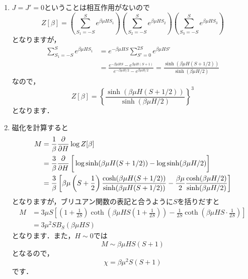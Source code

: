 \documentclass[a4paper,pdflatex,ja=standard]{bxjsarticle}
\begin{document}
\begin{enumerate}
  
  \item 

  $J=J'=0$ということは相互作用がないので
  \begin{equation}
    Z[\beta]
    =
    \left(  
      \sum_{S_1=-S}^{S}
      e^{\beta\mu HS_1}
    \right)
    \left(  
      \sum_{S_2=-S}^{S}
      e^{\beta\mu HS_2}
    \right)
    \left(  
      \sum_{S_3=-S}^{S}
      e^{\beta\mu HS_3}
    \right)
  \end{equation}
  となりますが，
  \begin{align}    
    \sum_{S_1=-S}^{S}
    e^{\beta\mu HS_1}
    &=
    e^{-\beta\mu HS}
    \sum_{S'=0}^{2S}
    e^{\beta\mu HS'}
    \nonumber
    \\
    &=
    \frac{e^{-\beta\mu HS}-e^{\beta\mu H(S+1)}}{e^{-\beta\mu H/2}-e^{\beta\mu H/2}}
    =
    \frac{\sinh(\beta\mu H(S+1/2))}{\sinh(\beta\mu H/2)}
  \end{align}
  なので，
  \begin{equation}
    Z[\beta]
    =\left\{  
      \frac{\sinh(\beta\mu H(S+1/2))}{\sinh(\beta\mu H/2)}      
    \right\}^3
  \end{equation}
  となります．


  \item 

  磁化を計算すると
  \begin{align}
    M
    &=
    \frac{1}{\beta}
    \pdv{}{H}\log Z[\beta]
    \nonumber
    \\
    &=
    \frac{3}{\beta}
    \pdv{}{H}
    \left[  
      \vphantom{\dfrac{1}{2}}
      \log\sinh(\beta\mu H(S+1/2))
      -
      \log\sinh(\beta\mu H/2)
    \right]
    \nonumber
    \\
    &=
    \frac{3}{\beta}
    \left[  
      \beta\mu\left( S+\frac{1}{2} \right)
      \frac{\cosh(\beta\mu H(S+1/2))}{\sinh(\beta\mu H(S+1/2))}
      -
      \frac{\beta\mu}{2}
      \frac{\cosh(\beta\mu H/2)}{\sinh(\beta\mu H/2)}
    \right]
  \end{align}
  となりますが，ブリユアン関数の表記と合うように$S$を括りだすと
  \begin{align}
    M
    &=
    3\mu S
    \left[  
      \left( 1+\frac{1}{2S} \right)
      \coth\left( \beta\mu HS\left( 1+\frac{1}{2S} \right) \right)
      -
      \frac{1}{2S}
      \coth\left( \beta\mu HS\cdot\frac{1}{2S} \right)
    \right]    
    \nonumber
    \\
    &=
    3\mu^2 S B_S(\beta\mu HS)
  \end{align}
  となります．また，$H\sim 0$では
  \begin{equation}
    M\sim\beta\mu HS(S+1)
  \end{equation}
  となるので，
  \begin{equation}
    \chi
    =
    \beta\mu^2 S(S+1)
  \end{equation}
  です．



\end{enumerate}
\end{document}
